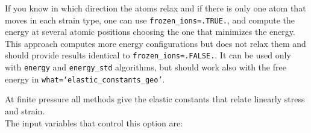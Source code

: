 \documentclass[12pt,a4paper,twoside]{report}
\begin{document}
If you know in which direction the atoms relax and if there is only one
atom that moves in each strain type, one can use \texttt{frozen\_ions=.TRUE.},
and compute the energy at several atomic positions choosing the one
that minimizes the energy. This approach computes more energy configurations 
but does not relax them and should provide results identical to 
\texttt{frozen\_ions=.FALSE.}. It can be used only with \texttt{energy}
and \texttt{energy\_std} algorithms, but should work also with the
free energy in \texttt{what=`elastic\_constants\_geo'}.

At finite pressure all methods give the elastic constants that
relate linearly stress and strain. \\
The input variables that control this option are:

\end{document}
